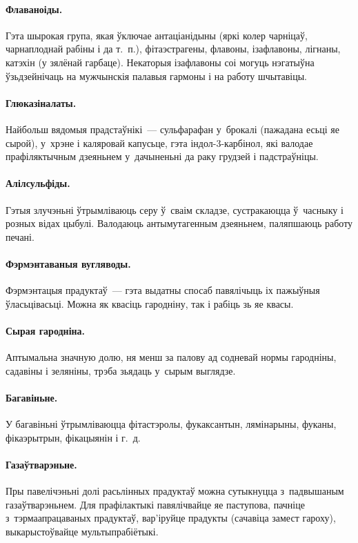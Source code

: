 \paragraph{Флаваноіды.}
Гэта шырокая група, якая ўключае антаціанідыны (яркі колер чарніцаў, чарнаплоднай рабіны і да т.~п.), фітаэстрагены, флавоны, ізафлавоны, лігнаны, катэхін (у зялёнай гарбаце). Некаторыя ізафлавоны соі могуць нэгатыўна ўзьдзейнічаць на мужчынскія палавыя гармоны і на работу шчытавіцы.

\paragraph{Глюказіналаты.}
Найбольш вядомыя прадстаўнікі~--- сульфарафан у~брокалі (пажадана есьці яе сырой), у~хрэне і каляровай капусьце, гэта індол-3-карбінол, які валодае прафіляктычным дзеяньнем у~дачыненьні да раку грудзей і падстраўніцы.

\paragraph{Алілсульфіды.}
Гэтыя злучэньні ўтрымліваюць серу ў~сваім складзе, сустракаюцца ў~часныку і розных відах цыбулі. Валодаюць антымутагенным дзеяньнем, паляпшаюць работу печані.

\paragraph{Фэрмэнтаваныя вугляводы.}
Фэрмэнтацыя прадуктаў~--- гэта выдатны спосаб павялічыць іх пажыўныя ўласьцівасьці. Можна як квасіць гародніну, так і рабіць зь яе квасы.

\paragraph{Сырая гародніна.}
Аптымальна значную долю, ня менш за палову ад содневай нормы гародніны, садавіны і зеляніны, трэба зьядаць у~сырым выглядзе.

\paragraph{Багавіньне.}
У багавіньні ўтрымліваюцца фітастэролы, фукаксантын, лямінарыны, фуканы, фікаэрытрын, фікацыянін і г.~д.

\paragraph{Газаўтварэньне.}
Пры павелічэньні долі расьлінных прадуктаў можна сутыкнуцца з~падвышаным газаўтварэньнем. Для прафілактыкі павялічвайце яе паступова, пачніце з~тэрмаапрацаваных прадуктаў, вар'іруйце прадукты (сачавіца замест гароху), выкарыстоўвайце мультыпрабіётыкі.


